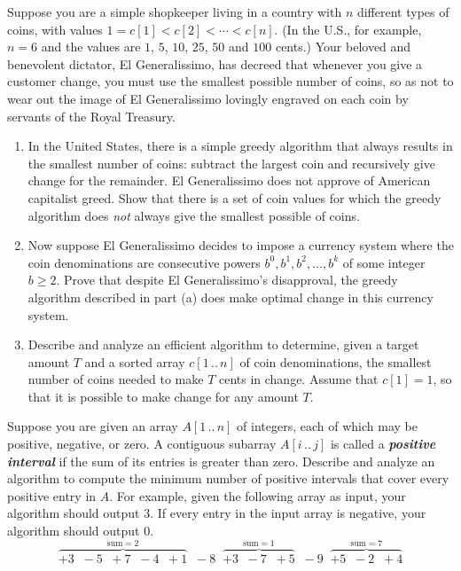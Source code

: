 \begin{exercises}
\item Suppose you are a simple shopkeeper living in a country with $n$ different types of coins, with values $1 = c[1] < c[2] < \cdots < c[n]$. (In the U.S., for example, $n = 6$ and the values are $1$, $5$, $10$, $25$, $50$ and $100$ cents.) Your beloved and benevolent dictator, El Generalissimo, has decreed that whenever you give a customer change, you must use the smallest possible number of coins, so as not to wear out the image of El Generalissimo lovingly engraved on each coin by servants of the Royal Treasury.
\begin{enumerate}[label=(\alph*)]
\item In the United States, there is a simple greedy algorithm that always results in the smallest number of coins: subtract the largest coin and recursively give change for the remainder. El Generalissimo does not approve of American capitalist greed. Show that there is a set of coin values for which the greedy algorithm does \textit{not} always give the smallest possible of coins.
\item Now suppose El Generalissimo decides to impose a currency system where the coin denominations are consecutive powers $b^0, b^1, b^2, \ldots, b^k$ of some integer $b \ge 2$. Prove that despite El Generalissimo’s disapproval, the greedy algorithm described in part (a) does make optimal change in this currency system.
\item Describe and analyze an efficient algorithm to determine, given a target amount $T$ and a sorted array $c[1\,..\,n]$ of coin denominations, the smallest number of coins needed to make $T$ cents in change. Assume that $c[1] = 1$, so that it is possible to make change for any amount $T$.
\end{enumerate}

\item Suppose you are given an array $A[1\,..\,n]$ of integers, each of which may be positive, negative, or zero. A contiguous subarray $A[i\,..\,j]$ is called a \textbf{\textit{positive interval}} if the sum of its entries is greater than zero. Describe and analyze an algorithm to compute the minimum number of positive intervals that cover every positive entry in $A$. For example, given the following array as input, your algorithm should output $3$. If every entry in the input array is negative, your algorithm should output $0$.
\[
\overbrace{+3 \;\; -5 \;\; +7 \;\; -4 \;\; +1}^{\mbox{sum}=2} \;\; -8 \;\;
\overbrace{+3 \;\; -7 \;\; +5}^{\mbox{sum}=1} \;\; -9 \;\;
\overbrace{+5 \;\; -2 \;\; +4}^{\mbox{sum}=7}
\]


\end{exercises}
